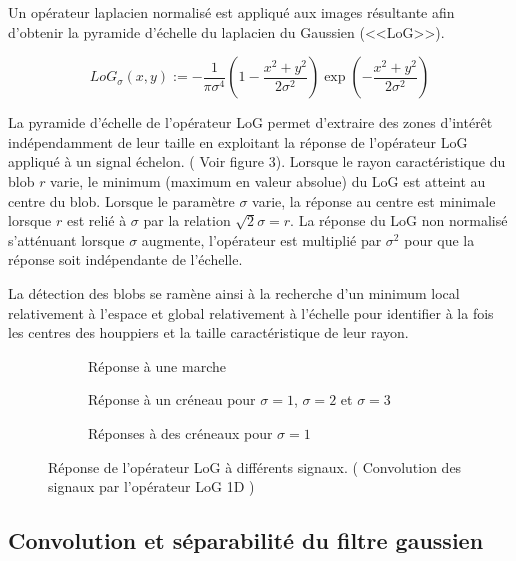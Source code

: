 \documentclass{article}
\begin{document}
	Un opérateur laplacien normalisé est appliqué aux images résultante afin d'obtenir la pyramide d'échelle du laplacien du Gaussien (<<LoG>>). 

	\[{LoG}_{\sigma}(x,y):=-\frac{1}{\pi\sigma^{4}}(1-\frac{x^{2}+y^{2}}{2\sigma^{2}})\exp(-\frac{x^{2}+y^{2}}{2\sigma^{2}})\] 

	La pyramide d'échelle de l'opérateur LoG permet d'extraire des zones d'intérêt indépendamment de leur taille en exploitant la réponse de l'opérateur LoG appliqué à un signal échelon. ( Voir figure 3). Lorsque le rayon caractéristique du blob $r$ varie, le minimum (maximum en valeur absolue) du LoG est atteint au centre du blob. Lorsque le paramètre $\sigma$ varie, la réponse au centre est minimale lorsque $r$ est relié à $\sigma$ par la relation $\sqrt{2}\sigma=r$. La réponse du LoG non normalisé s'atténuant lorsque $\sigma$ augmente, l'opérateur est multiplié par $\sigma^{2}$ pour que la réponse soit indépendante de l'échelle.

	La détection des blobs se ramène ainsi à la recherche d'un minimum local relativement à l'espace et global relativement à l'échelle pour identifier à la fois les centres des houppiers et la taille caractéristique de leur rayon. 

	
\begin{figure}[h]
	\begin{subfigure}{.5\textwidth}
		\scalebox{0.3}{}
		\caption{Réponse à une marche}
	\end{subfigure}
	\begin{subfigure}{.5\textwidth}
		\scalebox{0.3}{}
		\caption{Réponse à un créneau pour $\sigma=1$, $\sigma=2$ et $\sigma=3$ }
	\end{subfigure}
	\begin{subfigure}{.5\textwidth}
		\scalebox{0.3}{}
		\caption{Réponses à des créneaux pour $\sigma=1$}
	\end{subfigure}
	\caption{Réponse de l'opérateur LoG à différents signaux. ( Convolution des signaux par l'opérateur LoG 1D )}
	\label{fig:graph}
\end{figure}


	\subsection{Convolution et séparabilité du filtre gaussien}
\end{document}
